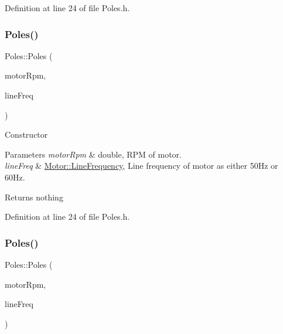 Definition at line 24 of file Poles.\+h.

\mbox{\label{class_poles_aade5d01dab7a461e582449e5bb17f6d6}} 
\subsubsection{\texorpdfstring{Poles()}{Poles()}\hspace{0.1cm}{\footnotesize\ttfamily [2/3]}}
{\footnotesize\ttfamily Poles\+::\+Poles (\begin{DoxyParamCaption}\item[{double}]{motor\+Rpm,  }\item[{\hyperlink{class_motor_acee1bdf1b684ad36cb80dc2829d9fcee}{Motor\+::\+Line\+Frequency}}]{line\+Freq }\end{DoxyParamCaption})\hspace{0.3cm}{\ttfamily [inline]}}

Constructor 
\begin{DoxyParams}{Parameters}
{\em motor\+Rpm} & double, R\+PM of motor. \\
\hline
{\em line\+Freq} & \hyperlink{class_motor_acee1bdf1b684ad36cb80dc2829d9fcee}{Motor\+::\+Line\+Frequency}, Line frequency of motor as either 50\+Hz or 60\+Hz. \\
\hline
\end{DoxyParams}
\begin{DoxyReturn}{Returns}
nothing 
\end{DoxyReturn}


Definition at line 24 of file Poles.\+h.

\mbox{\label{class_poles_aade5d01dab7a461e582449e5bb17f6d6}} 
\subsubsection{\texorpdfstring{Poles()}{Poles()}\hspace{0.1cm}{\footnotesize\ttfamily [3/3]}}
{\footnotesize\ttfamily Poles\+::\+Poles (\begin{DoxyParamCaption}\item[{double}]{motor\+Rpm,  }\item[{\hyperlink{class_motor_acee1bdf1b684ad36cb80dc2829d9fcee}{Motor\+::\+Line\+Frequency}}]{line\+Freq }\end{DoxyParamCaption})\hspace{0.3cm}{\ttfamily [inline]}}

